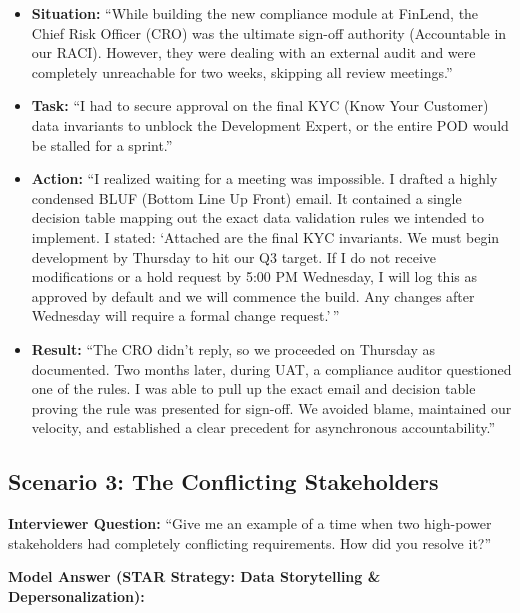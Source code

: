 \documentclass[
  11pt,
  openany,
  oneside]{book}
\providecommand{\tightlist}{%
  \setlength{\itemsep}{0pt}\setlength{\parskip}{0pt}}
\begin{document}
\begin{itemize}
\tightlist
\item
  \textbf{Situation:} ``While building the new compliance module at
  FinLend, the Chief Risk Officer (CRO) was the ultimate sign-off
  authority (Accountable in our RACI). However, they were dealing with
  an external audit and were completely unreachable for two weeks,
  skipping all review meetings.''
\item
  \textbf{Task:} ``I had to secure approval on the final KYC (Know Your
  Customer) data invariants to unblock the Development Expert, or the
  entire POD would be stalled for a sprint.''
\item
  \textbf{Action:} ``I realized waiting for a meeting was impossible. I
  drafted a highly condensed BLUF (Bottom Line Up Front) email. It
  contained a single decision table mapping out the exact data
  validation rules we intended to implement. I stated: `Attached are the
  final KYC invariants. We must begin development by Thursday to hit our
  Q3 target. If I do not receive modifications or a hold request by 5:00
  PM Wednesday, I will log this as approved by default and we will
  commence the build. Any changes after Wednesday will require a formal
  change request.'\,''
\item
  \textbf{Result:} ``The CRO didn't reply, so we proceeded on Thursday
  as documented. Two months later, during UAT, a compliance auditor
  questioned one of the rules. I was able to pull up the exact email and
  decision table proving the rule was presented for sign-off. We avoided
  blame, maintained our velocity, and established a clear precedent for
  asynchronous accountability.''
\end{itemize}

\subsection{Scenario 3: The Conflicting
Stakeholders}\label{scenario-3-the-conflicting-stakeholders}

\textbf{Interviewer Question:} ``Give me an example of a time when two
high-power stakeholders had completely conflicting requirements. How did
you resolve it?''

\textbf{Model Answer (STAR Strategy: Data Storytelling \&
Depersonalization):}
\end{document}
